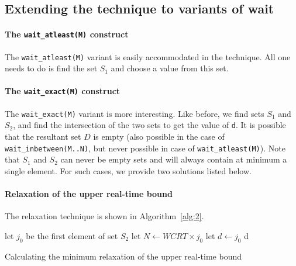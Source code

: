 \subsection{Extending the technique to variants of wait}
\label{sec:extend-tehcn-vari}

\paragraph{The \texttt{wait\_atleast(M)} construct}
\label{sec:extend-techn-vari}

The \texttt{wait\_atleast(M)} variant is easily accommodated in the
technique. All one needs to do is find the set $S_1$ and choose a value
from this set.

\paragraph{The \texttt{wait\_exact(M)} construct}
\label{sec:extend-techn-vari}

The \texttt{wait\_exact(M)} variant is more interesting. Like before,
we find sets $S_1$ and $S_2$, and find the intersection of the two sets
to get the value of \texttt{d}. It is possible %
that the resultant set $D$ is empty (also possible in the case of
\texttt{wait\_inbetween(M..N)}, but never possible in case of
\texttt{wait\_atleast(M)}). Note that $S_1$ and $S_2$ can never be empty
sets and will always contain at minimum a single element. For such
cases, we provide two solutions listed below.


\paragraph{Relaxation of the upper real-time bound}
\label{sec:over-appr-relax}

The relaxation technique is shown in Algorithm~\ref{alg:2}.
  
\begin{algorithm}[t!]
  \begin{minipage}{1.0\linewidth}
    \SetAlgoLined
     {
      let $j_{0}$ be the first element of set $S_2$\;
      \ShowLn let $N \leftarrow WCRT \times j_0$\;
      let $d \leftarrow j_0$\;
    }
    \Return d\;
    \caption{Calculating the minimum relaxation of the upper real-time
      bound}
    \label{alg:2}
  \end{minipage}
\end{algorithm}



